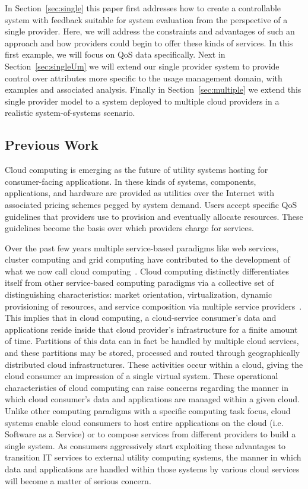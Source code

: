 
In Section~\ref{sec:single} this paper first addresses how to create a controllable system with feedback suitable for system evaluation from the perspective of a single provider. Here, we will address the constraints and advantages of such an approach and how providers could begin to offer these kinds of services.  In this first example, we will focus on QoS data specifically.  Next in Section~\ref{sec:singleUm} we will extend our single provider system to provide control over attributes more specific to the usage management domain, with examples and associated analysis.  Finally in Section~\ref{sec:multiple} we extend this single provider model to a system deployed to multiple cloud providers in a realistic system-of-systems scenario.

\subsection{Previous Work}
Cloud computing is emerging as the future of utility systems hosting for consumer-facing applications.  In these kinds of systems, components, applications, and hardware are provided as utilities over the Internet with associated pricing schemes pegged by system demand.  Users accept specific QoS guidelines that providers use to provision and eventually allocate resources. These guidelines become the basis over which providers charge for services.

Over the past few years multiple service-based paradigms like web services, cluster computing and grid computing have contributed to the development of what we now call cloud computing~\cite{Bu:09}. Cloud computing distinctly differentiates itself from other service-based computing paradigms via a collective set of distinguishing characteristics:  market orientation, virtualization, dynamic provisioning of resources, and service composition via multiple service providers~\cite{BuYeVeBrBr:09}. This implies that in cloud computing, a cloud-service consumer's data and applications reside inside that cloud provider's infrastructure for a finite amount of time.  Partitions of this data can in fact be handled by multiple cloud services, and these partitions may be stored, processed and routed through geographically distributed cloud infrastructures. These activities occur within a cloud, giving the cloud consumer an impression of a single virtual system.  These operational characteristics of cloud computing can raise concerns regarding the manner in which cloud consumer's data and applications are managed within a given cloud. Unlike other computing paradigms with a specific computing task focus, cloud systems enable cloud consumers to host entire applications on the cloud (i.e. Software as a Service) or to compose services from different providers to build a single system. As consumers aggressively start exploiting these advantages to transition IT services to external utility computing systems, the manner in which data and applications are handled within those systems by various cloud services will become a matter of serious concern.

